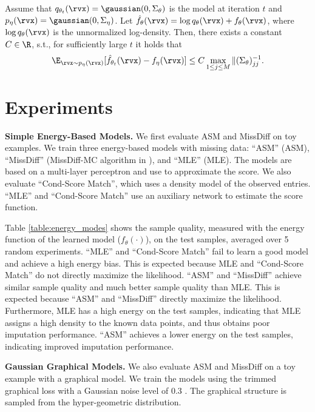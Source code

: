 \documentclass{article} %
\begin{document}
\begin{theorem}%
	\label{thm:energy_bias_asm}
	Assume that $q_{\theta_{t}}(\rvx) = \gaussian(0, \Sigma_{\theta})$ is the model at iteration $t$ and $p_{\eta}(\rvx) = \gaussian(0, \Sigma_{\eta})$. Let $\hat{f}_{\theta}(\rvx) = \log q_{\theta}(\rvx) + f_{\theta}(\rvx)$, where $\log q_{\theta}(\rvx)$ is the unnormalized log-density. Then, there exists a constant $C \in \R$, s.t., for sufficiently large $t$ it holds that
	\begin{align*}
		\E_{\rvx \sim p_{\eta}(\rvx)}[\hat{f}_{\theta_{t}}(\rvx) - f_{\eta}(\rvx)] \leq C \max_{1 \leq j \leq M} \|(\Sigma_{\theta})^{-1}_{jj}.
	\end{align*}
\end{theorem}




\section{Experiments}

\label{sec:experiments}
\textbf{Simple Energy-Based Models.} We first evaluate ASM and MissDiff on toy examples. We train three energy-based models with missing data: ``ASM'' (ASM), ``MissDiff'' (MissDiff-MC algorithm in \citet{Ouyang2023}), and ``MLE'' (MLE). The models are based on a multi-layer perceptron and use  to approximate the score. We also evaluate ``Cond-Score Match'', which uses a density model of the observed entries. ``MLE'' and ``Cond-Score Match'' use an auxiliary network to estimate the score function.


Table \ref{table:energy_modes} shows the sample quality, measured with the energy function of the learned model ($f_{\theta}(\cdot)$), on the test samples, averaged over 5 random experiments. ``MLE'' and ``Cond-Score Match'' fail to learn a good model and achieve a high energy bias. This is expected because MLE and ``Cond-Score Match'' do not directly maximize the likelihood. ``ASM'' and ``MissDiff'' achieve similar sample quality and much better sample quality than MLE. This is expected because ``ASM'' and ``MissDiff'' directly maximize the likelihood. Furthermore, MLE has a high energy on the test samples, indicating that MLE assigns a high density to the known data points, and thus obtains poor imputation performance. ``ASM'' achieves a lower energy on the test samples, indicating improved imputation performance.


\textbf{Gaussian Graphical Models.} We also evaluate ASM and MissDiff on a toy example with a graphical model. We train the models using the trimmed graphical loss with a Gaussian noise level of 0.3 \citep{Yang2015}. The graphical structure is sampled from the hyper-geometric distribution.
\end{document}

